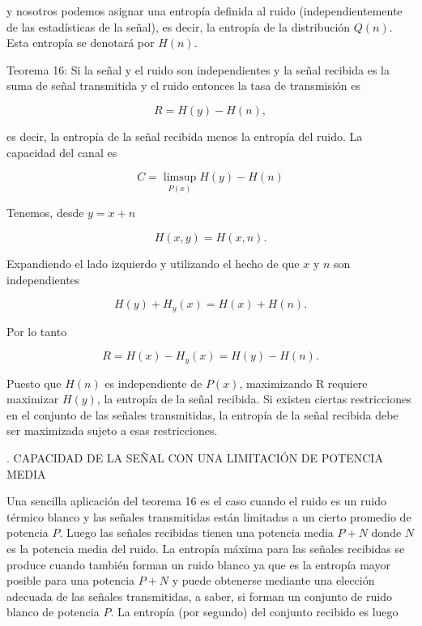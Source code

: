 	
	y nosotros podemos asignar una entrop\'ia definida al ruido (independientemente de 
	las estad\'isticas de la se\~nal), es decir, la entrop\'ia de la distribuci\'on
	$Q(n)$. Esta entrop\'ia se denotar\'a por $H(n)$.
	
	\begin{em}
		Teorema 16: Si la se\~nal y el ruido son independientes y la se\~nal recibida
		es la suma de se\~nal transmitida y el ruido entonces la tasa de transmisi\'on es
	\end{em}
	
	\begin{equation}
		R = H(y) - H(n),
	\end{equation}
	
	es decir, la entrop\'ia de la se\~nal recibida menos la entrop\'ia del ruido. La
	capacidad del canal es
	
	\begin{equation}
		C = \limsup_{P(x)} H(y) - H(n)
	\end{equation}
	
	Tenemos, desde $y = x+n$
	
	\begin{equation}
		H(x,y) = H(x,n).
	\end{equation}
	
	Expandiendo el lado izquierdo y utilizando el hecho de que $x$ y $n$ son independientes
	
	\begin{equation}
		H(y) + H_{y}(x) = H(x) + H(n).
	\end{equation}
	
	Por lo tanto
	
	\begin{equation}
		R = H(x) - H_{y}(x) = H(y) - H(n).
	\end{equation}
	
	Puesto que $H(n)$ es independiente de $P(x)$, maximizando R requiere maximizar $H(y)$,
	la entrop\'ia de la se\~nal recibida. Si existen ciertas restricciones en el conjunto
	de las se\~nales transmitidas, la entrop\'ia de la se\~nal recibida debe ser maximizada
	sujeto a esas restricciones.
	
	. CAPACIDAD DE LA SE\~NAL  CON UNA LIMITACI\'ON DE POTENCIA MEDIA
	\bigskip	
	
	Una sencilla aplicaci\'on del teorema 16 es el caso cuando el ruido es un ruido
	t\'ermico blanco y las se\~nales transmitidas est\'an limitadas a un cierto 
	promedio de potencia $P$. Luego las se\~nales recibidas tienen una potencia media
	$P + N$ donde $N$ es la potencia media del ruido. La entrop\'ia m\'axima para las
	se\~nales recibidas se produce cuando tambi\'en forman un ruido blanco ya que 
	es la entrop\'ia mayor posible para una potencia $P + N$ y puede obtenerse mediante
	una elecci\'on adecuada de las se\~nales transmitidas, a saber, si forman un conjunto
	de ruido blanco de potencia $P$. La entrop\'ia (por segundo) del conjunto recibido es luego
	
